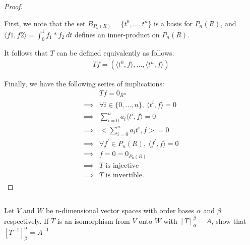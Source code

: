 \documentclass{article}
\newenvironment{customthm}[1]
  {\renewcommand\theinnercustomthm{#1}\innercustomthm}
  {\endinnercustomthm}
\begin{document}
\begin{proof}
  $ $

  First, we note that the set $B_{P_n(R)} = \{ t^0, \ldots, t^n \}$ is a basis for $P_n(R)$, and $\langle f1, f2 \rangle = \int_{0}^{1} f_1*f_2 \: dt$ defines an inner-product on $P_n(R)$.
  \newline

  It follows that $T$ can be defined equivalently as follows:
  \begin{align*}
    Tf = (\langle t^0, f \rangle, \ldots , \langle t^n, f\rangle)
  \end{align*}

  Finally, we have the following series of implications:
  \begin{align*}
    & Tf = 0_{R^n} \\
    \implies& \forall i \in \{0,\ldots, n\}, \: \langle t^i, f \rangle = 0 \\
    \implies& \sum_{i = 0}^{n} a_i \langle t^i, f \rangle = 0 \\
    \implies& \biggl< \sum_{i = 0}^{n} a_i t^i, f \biggr> = 0 \\
    \implies& \forall f^\prime \in P_n(R), \: \langle f^\prime, f \rangle = 0 \\
    \implies& f = 0 = 0_{P_n(R)} \\
    \implies& T \text{ is injective} \\
    \implies& T \text{ is invertible.} \\
  \end{align*}

\end{proof}
\newpage

\begin{customthm}{8}[2023.S(2.B), 2021.F(2.A)]
  $ $

  Let $V$ and $W$ be n-dimensional vector spaces with order bases $\alpha$ and $\beta$ respectively. If $T$ is an isomorphism from $V$ onto $W$ with $[T]_\alpha^\beta = A$, show that $[T^{-1}]_\beta^\alpha = A^{-1}$

\end{customthm}
\end{document}

